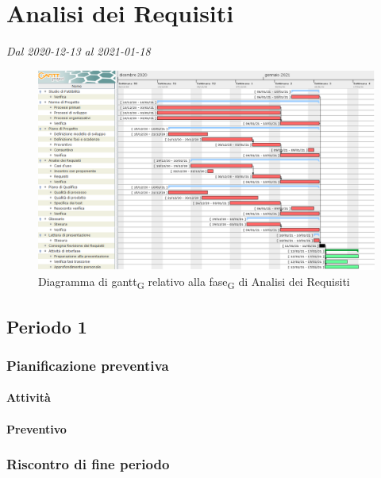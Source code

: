 \section{Analisi dei Requisiti}
\textit{Dal 2020-12-13 al 2021-01-18}


\begin{figure}[H]
	\centering
	\includegraphics[scale=0.45]{res/images/02_gantt_analisi_requisiti.png}
	\caption{Diagramma di gantt\textsubscript{G} relativo alla fase\textsubscript{G} di Analisi dei Requisiti}
\end{figure}


\subsection{Periodo 1}

\subsubsection{Pianificazione preventiva}

\paragraph{Attività}

\planningTable{
	
}


\paragraph{Preventivo}

\smallPreventivoTable{
	
}


\subsubsection{Riscontro di fine periodo}


